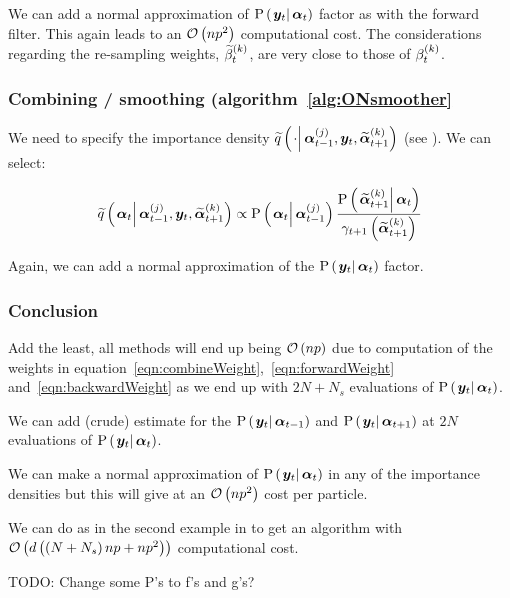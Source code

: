 We can add a normal approximation of $\propC{\vec{y}_t}{\vec{\alpha}_t}$ factor as with the forward filter. This again leads to an $\mathcal{O}\left( np^2\right)$ computational cost. The considerations regarding the re-sampling weights, $\widetilde{\beta}_{t}^{\left( k\right)}$, are very close to those of $\beta_{t}^{\left( k\right)}$.

\subsubsection*{Combining / smoothing (algorithm~\ref{alg:ONsmoother}}
We need to specify the importance density $\IDAproxC{\cdot}{\partic{\vec{\alpha}}{t-1}{j},\vec{y}_t, \particB{\vec{\alpha}}{t+1}{k}}$ (see \citet[page 453] {fearnhead10}). We can select:

\begin{equation}
	\IDAproxC{\vec{\alpha}_t}{\partic{\vec{\alpha}}{t-1}{j},\vec{y}_t, \particB{\vec{\alpha}}{t+1}{k}} \propto %
%
	\propC{\vec{\alpha}_t}{\partic{\vec{\alpha}}{t - 1}{j}}
	\frac{
		\propC{\particB{\vec{\alpha}}{t + 1}{k}}{\vec{\alpha}_t}
	}{
		\gamma_{t + 1}\Lparen{\particB{\vec{\alpha}}{t + 1}{k}}
	}
\end{equation}

Again, we can add a normal approximation of the $\propC{\vec{y}_t}{\vec{\alpha}_t}$ factor.

\subsubsection*{Conclusion}
Add the least, all methods will end up being $\mathcal{O}\left( np\right)$ due to computation of the weights in equation~\eqref{eqn:combineWeight},~\eqref{eqn:forwardWeight} and~\eqref{eqn:backwardWeight} as we end up with $2N + N_s$ evaluations of $\propC{\vec{y}_t}{\vec{\alpha}_t}$.

We can add (crude) estimate for the $\propC{\vec{y}_t}{\vec{\alpha}_{t - 1}}$ and $\propC{\vec{y}_t}{\vec{\alpha}_{t + 1}}$ at  $2N$ evaluations of  $\propC{\vec{y}_t}{\vec{\alpha}_t}$.

We can make a normal approximation of  $\propC{\vec{y}_t}{\vec{\alpha}_t}$ in any of the importance densities but this will give at an $\mathcal{O}\left( np^2\right)$ cost per particle.

We can do as in the second example in \citet[page~462 and 463]{fearnhead10} to get an algorithm with $\mathcal{O}\left( d\left( \left( N + N_s\right)np + np^2\right)\right)$ computational cost.

\newpage

TODO: Change some P's to f's and g's?

